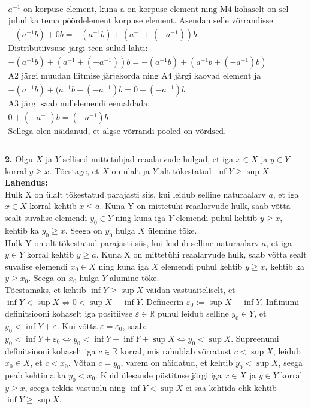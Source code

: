 \documentclass{article}
\begin{document}
\begin{equation*}
\begin{aligned}
a^{-1}\text{ on korpuse element, kuna a on korpuse element ning M4 kohaselt on sel}\\
\text{juhul ka tema p\"o\"ordelement korpuse element. Asendan selle v\~orrandisse.}\\
-(a^{-1}b)+0b=-(a^{-1}b)+(a^{-1}+(-a^{-1}))b\\
\text{Distributiivsuse j\"argi teen sulud lahti:}\\
-(a^{-1}b)+(a^{-1}+(-a^{-1}))b=-(a^{-1}b)+(a^{-1}b+(-a^{-1})b)\\
\text{A2 j\"argi muudan liitmise j\"arjekorda ning A4 j\"argi kaovad element ja vastandelement}\\
-(a^{-1}b)+(a^{-1}b+(-a^{-1})b=0+(-a^{-1})b\\
\text{A3 j\"argi saab nullelemendi eemaldada:}\\
0+(-a^{-1})b=(-a^{-1})b\\
\text{Sellega olen n\"aidanud, et algse v\~orrandi pooled on v\~ordsed.}\\
\end{aligned}
\end{equation*}
\pagebreak\\
\textbf{2.} Olgu $X$ ja $Y$ sellised mittet\"uhjad reaalarvude hulgad, et iga $x\in X$ ja $y\in Y$ korral $y\geq x$. T\~oestage, et $X$ on \"ulalt ja $Y$ alt t\~okestatud $\inf Y \geq \sup X$.\\
\textbf{Lahendus:}\\
Hulk X on \"ulalt t\~okestatud parajasti siis, kui leidub selline naturaalarv $a$, et iga $x\in X$ korral kehtib $x\leq a$. Kuna Y on mittet\"uhi reaalarvude hulk, saab v\~otta sealt suvalise elemendi $y_0\in Y$ ning kuna iga $Y$ elemendi puhul kehtib $y\geq x$, kehtib ka $y_0\geq x$. Seega on $y_0$ hulga $X$ \"ulemine t\~oke.\\
Hulk Y on alt t\~okestatud parajasti siis, kui leidub selline naturaalarv $a$, et iga $y\in Y$ korral kehtib $y\geq a$. Kuna X on mittet\"uhi reaalarvude hulk, saab v\~otta sealt suvalise elemendi $x_0\in X$ ning kuna iga $X$ elemendi puhul kehtib $y\geq x$, kehtib ka $y\geq x_0$. Seega on $x_0$ hulga $Y$ alumine t\~oke.\\
T\~oestamaks, et kehtib $\inf Y \geq \sup X$ v\"aidan vastu\"aiteliselt, et $\inf Y < \sup X\Leftrightarrow 0 < \sup X-\inf Y$. Defineerin $\varepsilon_0 :=\sup X-\inf Y$. Infiinumi definitsiooni kohaselt iga positiivse $\varepsilon\in\mathbb{R}$ puhul leidub selline $y_0\in Y$, et $y_0<\inf Y +\varepsilon$. Kui v\~otta $\varepsilon=\varepsilon_0$, saab: $y_0<\inf Y +\varepsilon_0\Leftrightarrow y_0<\inf Y -\inf Y+\sup X\Leftrightarrow y_0<\sup X$. Supreenumi definitsiooni kohaselt iga $c\in\mathbb{R}$ korral, mis rahuldab v\~orratust $c<\sup X$, leidub $x_0\in X$, et $c<x_0$. V\~otan $c=y_0$, varem on n\"aidatud, et kehtib $y_0<\sup X$, seega peab kehtima ka $y_0<x_0$. Kuid \"ulesande p\"ustituse j\"argi iga $x\in X$ ja $y\in Y$ korral $y\geq x$, seega tekkis vastuolu ning $\inf Y < \sup X$ ei saa kehtida ehk kehtib $\inf Y \geq \sup X$.\\\\
\end{document}
